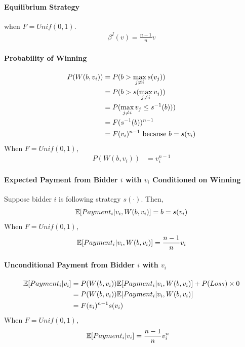 \documentclass{article}
\begin{document}
	\paragraph{Equilibrium Strategy} when $F = Unif(0, 1)$.
	\begin{align}
		\beta^I(v) = \frac{n-1}{n} v
	\end{align}
	
	\paragraph{Probability of Winning}
	\begin{align}
		P(W(b, v_i))
		&= P(b > \max_{j \neq i} s(v_j)) \\
		&= P(b > s(\max_{j \neq i} v_j)) \\
		&= P(\max_{j \neq i} v_j \leq s^{-1}(b))) \\
		&= F(s^{-1}(b))^{n-1} \\
		&= F(v_i)^{n-1} \text{{ because }} b = s(v_i)
	\end{align}
	When $F = Unif(0, 1)$,
	\begin{align}
		P(W(b, v_i)) &= v_i^{n-1}
	\end{align} 
	
	\paragraph{Expected Payment from Bidder $i$ with $v_i$ Conditioned on Winning} Suppose bidder $i$ is following strategy $s(\cdot)$. Then,
	\begin{align}
		\mathbb{E}[{Payment_i|v_i, W(b, v_i)}] = b = s(v_i)
	\end{align}
	When $F = Unif(0, 1)$,
	\begin{align}
		\mathbb{E}[{Payment_i|v_i, W(b, v_i)}] = \frac{n-1}{n} v_i
	\end{align}
	
	\paragraph{Unconditional Payment from Bidder $i$ with $v_i$}
	\begin{align}
		\mathbb{E}[{Payment_i|v_i}] &= P(W(b, v_i)) \mathbb{E}[{Payment_i|v_i, W(b, v_i)}] + P(Loss) \times 0 \\
		&= P(W(b, v_i)) \mathbb{E}[{Payment_i|v_i, W(b, v_i)}] \\
		&= F(v_i)^{n-1} s(v_i)
	\end{align}
	When $F = Unif(0, 1)$,
	\begin{align}
		\mathbb{E}[{Payment_i|v_i}] &= \frac{n-1}{n}v_i^n
	\end{align}
\end{document}
